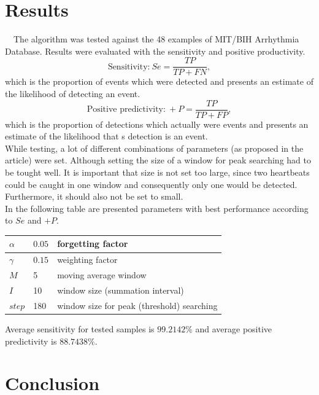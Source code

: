 \documentclass[a4paper,11pt]{article}
\begin{document}
\section{Results}

\ \ The algorithm was tested against the 48 examples of MIT/BIH Arrhythmia Database.
Results were evaluated with the sensitivity and positive productivity.
$$ \text{Sensitivity:} \ Se = \frac{TP}{TP + FN} , $$
which is the proportion of events which were detected and presents an estimate of the likelihood of detecting an event.
$$ \text{Positive predictivity:} \ +P = \frac{TP}{TP + FP} , $$
which is the proportion of detections which actually were events and presents an estimate of the likelihood that s detection is an event.
\\
While testing, a lot of different combinations of parameters (as proposed in the article) were set. 
Although setting the size of a window for peak searching had to be tought well. 
It is important that size is not set too large, since two heartbeats could be caught in one window and consequently only one would be detected. Furthermore, it should also not be set to small.
\\
In the following table are presented parameters with best performance according to $Se$ and $+P$.

\begin{table}[ht!]
    \centering
    \begin{tabular}{|l|l|l|}
    \hline
    $\alpha$ & $0.05$ & forgetting factor       \\ \hline
    $\gamma$ & $0.15$ & weighting factor        \\ \hline
    $M$      & 5      & moving average window   \\ \hline
    $I$      & 10     & window size (summation interval)      \\ \hline
    $step$   & 180    & window size for peak (threshold) searching \\ \hline
    \end{tabular}
\end{table}
\noindent
Average sensitivity for tested samples is $99.2142 \%$ and average positive predictivity is $88.7438 \%$.

\section{Conclusion}
\end{document}
